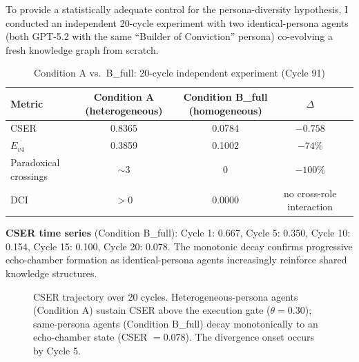 \documentclass[12pt]{article}
\begin{document}
To provide a statistically adequate control for the persona-diversity hypothesis,
I conducted an independent 20-cycle experiment with two identical-persona agents
(both GPT-5.2 with the same ``Builder of Conviction'' persona) co-evolving a fresh
knowledge graph from scratch.

\begin{table}[h!]\centering\small
\begin{tabular}{lcccc}
\toprule
Metric & Condition A (heterogeneous) & Condition B\_full (homogeneous) & $\Delta$ \\
\midrule
CSER & 0.8365 & 0.0784 & $-0.758$ \\
$E_{v4}$ & 0.3859 & 0.1002 & $-74\%$ \\
Paradoxical crossings & $\sim$3 & 0 & $-100\%$ \\
DCI & $> 0$ & 0.0000 & no cross-role interaction \\
\bottomrule
\end{tabular}
\caption{Condition A vs.\ B\_full: 20-cycle independent experiment (Cycle 91)}
\end{table}

\noindent\textbf{CSER time series} (Condition B\_full): Cycle 1: 0.667, Cycle 5: 0.350,
Cycle 10: 0.154, Cycle 15: 0.100, Cycle 20: 0.078. The monotonic decay confirms
progressive echo-chamber formation as identical-persona agents increasingly
reinforce shared knowledge structures.

\begin{figure}[h!]
\centering
{}
\caption{CSER trajectory over 20 cycles. Heterogeneous-persona agents (Condition A)
sustain CSER above the execution gate ($\theta=0.30$); same-persona agents
(Condition B\_full) decay monotonically to an echo-chamber state
(CSER $=0.078$). The divergence onset occurs by Cycle 5.}
\label{fig:cser_trajectory}
\end{figure}
\end{document}
